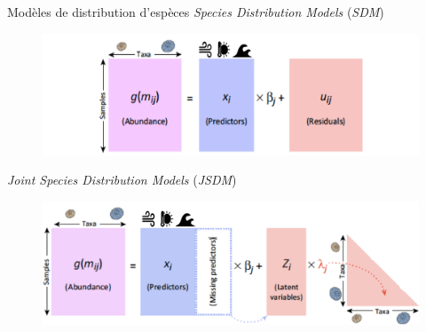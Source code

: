 \documentclass[%
]{beamer}
\begin{document}
	\begin{frame}{Modèles de distribution d'espèces}
		\emph{Species Distribution Models} (\emph{SDM})\vspace{\baselineskip}\\
	\begin{figure}[t]
		\begin{center}
			\includegraphics[scale = 0.1]{figs/glm.png}
		\end{center}
	\end{figure}\pause
		\emph{Joint Species Distribution Models} (\emph{JSDM})
		\begin{figure}[t]
		\begin{center}
			\includegraphics[scale = 0.1]{figs/lvm3.png}
		\end{center}
	\end{figure}
	\end{frame}
	
\end{document}
